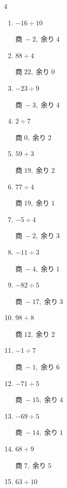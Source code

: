 \begin{multicols}{4}
\begin{enumerate}
  \item $-16 \div 10$

        $商\; -2,\; 余り\; 4$

\columnbreak %

\resetques

  \item $88 \div 4$

        $商\; 22,\; 余り\; 0$

  \item $-23 \div 9$

        $商\; -3,\; 余り\; 4$

  \item $2 \div 7$

        $商\; 0,\; 余り\; 2$

  \item $59 \div 3$

        $商\; 19,\; 余り\; 2$

  \item $77 \div 4$

        $商\; 19,\; 余り\; 1$

  \item $-5 \div 4$

        $商\; -2,\; 余り\; 3$

  \item $-11 \div 3$

        $商\; -4,\; 余り\; 1$

  \item $-82 \div 5$

        $商\; -17,\; 余り\; 3$

  \item $98 \div 8$

        $商\; 12,\; 余り\; 2$

  \item $-1 \div 7$

        $商\; -1,\; 余り\; 6$

  \item $-71 \div 5$

        $商\; -15,\; 余り\; 4$

  \item $-69 \div 5$

        $商\; -14,\; 余り\; 1$

  \item $68 \div 9$

        $商\; 7,\; 余り\; 5$

  \item $63 \div 10$


\end{enumerate}
\end{multicols}
